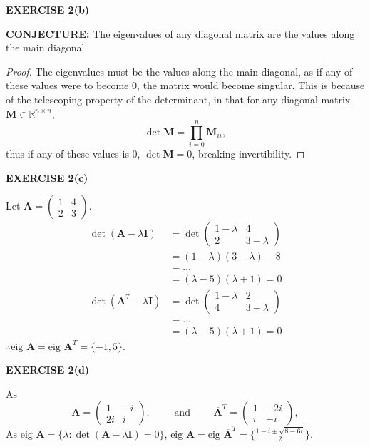 \documentclass[12pt]{article}
\newcommand{\mat}[1]{\mathbf{#1}}
\newcommand{\exercise}[1]{\textbf{EXERCISE #1}\label{#1}}
\newcommand{\conjecture}[1]{\textbf{CONJECTURE:} #1}
\newcommand{\eig}{\text{eig }}
\newcommand{\ct}[1]{\mat{\overline{#1}}^{T}}
\begin{document}
\exercise{2(b)}

\conjecture{The eigenvalues of any diagonal matrix are the values along the main diagonal.}

\begin{proof}
The eigenvalues must be the values along the main diagonal, as if any of these values were to become 0, the matrix would become singular. This is because of the telescoping property of the determinant, in that for any diagonal matrix $\mat{M} \in \mathbb{R}^{n \times n}$,
\begin{equation*}
\det \mat{M} = \prod_{i = 0}^{n} \mat{M}_{ii},
\end{equation*}
thus if any of these values is 0, $\det \mat{M} = 0$, breaking invertibility.
\end{proof} 

\exercise{2(c)}

Let $\mat{A} = \begin{pmatrix} 1 & 4 \\ 2 & 3 \end{pmatrix}$.
\begin{align*}
\det (\mat{A} - \lambda \mat{I})
&= \det \begin{pmatrix} 1 - \lambda & 4 \\ 2 & 3 - \lambda \end{pmatrix} \\
&= (1 - \lambda)(3 - \lambda) - 8 \\
&= \dots \\
&= (\lambda - 5)(\lambda + 1) = 0 \\
\det (\mat{A}^{T} - \lambda \mat{I})
&= \det \begin{pmatrix} 1 - \lambda & 2 \\ 4 & 3 - \lambda \end{pmatrix} \\
&= \dots \\
&= (\lambda - 5)(\lambda + 1) = 0
\end{align*}
$\therefore \eig \mat{A} = \eig \mat{A}^{T} = \{ -1, 5 \}$.

\exercise{2(d)}

As
\begin{equation*}
\mat{A} = \begin{pmatrix} 1 & -i \\ 2i & i \end{pmatrix}, \hspace{2em} \text{ and } \hspace{2em} \ct{A} = \begin{pmatrix} 1 & -2i \\ i & -i \end{pmatrix},
\end{equation*}
As $\eig \mat{A} = \{\lambda: \det(\mat{A} - \lambda \mat{I}) = 0 \}$, $\eig \mat{A} = \eig \ct{A} = \{ \frac{1 - i \pm \sqrt{8 - 6i} }{2}  \}$. 
\end{document}
